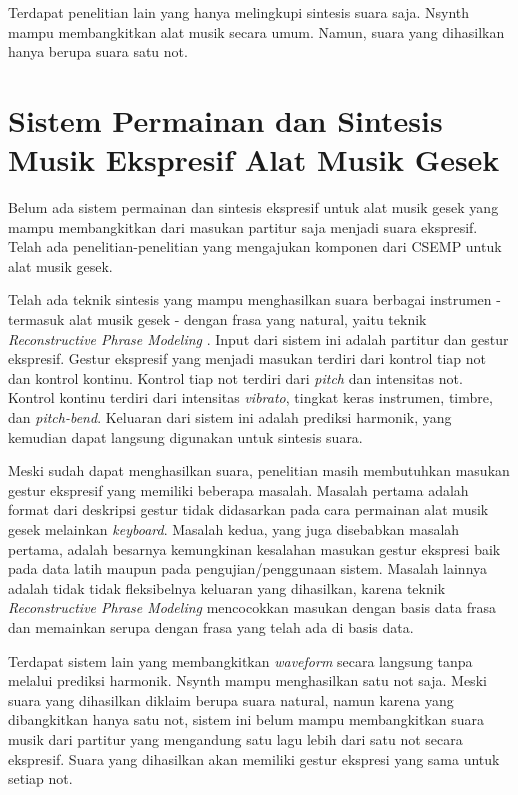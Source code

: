 Terdapat penelitian lain yang hanya melingkupi sintesis suara saja. Nsynth \parencite{nsynth2017} mampu membangkitkan alat musik secara umum. Namun, suara yang dihasilkan hanya berupa suara satu not.

\section{Sistem Permainan dan Sintesis Musik Ekspresif Alat Musik Gesek}

Belum ada sistem permainan dan sintesis ekspresif untuk alat musik gesek yang mampu membangkitkan dari masukan partitur saja menjadi suara ekspresif. Telah ada penelitian-penelitian yang mengajukan komponen dari CSEMP untuk alat musik gesek.

Telah ada teknik sintesis yang mampu menghasilkan suara berbagai instrumen - termasuk alat musik gesek - dengan frasa yang natural, yaitu teknik \textit{Reconstructive Phrase Modeling} \parencite{lindemann2007rpm}. Input dari sistem ini adalah partitur dan gestur ekspresif. Gestur ekspresif yang menjadi masukan terdiri dari kontrol tiap not dan kontrol kontinu. Kontrol tiap not terdiri dari \textit{pitch} dan intensitas not. Kontrol kontinu terdiri dari intensitas \textit{vibrato}, tingkat keras instrumen, timbre, dan \textit{pitch-bend}. Keluaran dari sistem ini adalah prediksi harmonik, yang kemudian dapat langsung digunakan untuk sintesis suara.

Meski sudah dapat menghasilkan suara, penelitian \citet{lindemann2007rpm} masih membutuhkan masukan gestur ekspresif yang memiliki beberapa  masalah. Masalah pertama adalah format dari deskripsi gestur tidak didasarkan pada cara permainan alat musik gesek melainkan \textit{keyboard}. Masalah kedua, yang juga disebabkan masalah pertama, adalah besarnya kemungkinan kesalahan masukan gestur ekspresi baik pada data latih maupun pada pengujian/penggunaan sistem. Masalah lainnya adalah tidak tidak fleksibelnya keluaran yang dihasilkan, karena teknik \textit{Reconstructive Phrase Modeling} mencocokkan masukan dengan basis data frasa dan memainkan serupa dengan frasa yang telah ada di basis data.

Terdapat sistem lain yang membangkitkan \textit{waveform} secara langsung tanpa melalui prediksi harmonik. Nsynth \parencite{nsynth2017} mampu menghasilkan satu not saja. Meski suara yang dihasilkan diklaim berupa suara natural, namun karena yang dibangkitkan hanya satu not, sistem ini belum mampu membangkitkan suara musik dari partitur yang mengandung satu lagu lebih dari satu not secara ekspresif. Suara yang dihasilkan akan memiliki gestur ekspresi yang sama untuk setiap not.

